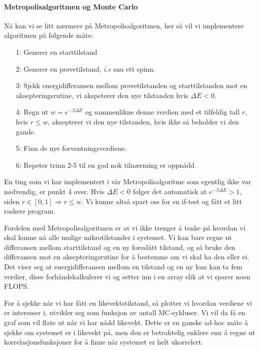 \documentclass[norsk, 10pt]{article}
\begin{document}
\paragraph{Metropolisalgoritmen og Monte Carlo}
Nå kan vi se litt nærmere på Metropolisalgoritmen, her så vil vi implementere algoritmen på følgende måte:
\begin{itemize}
\item[1:] Generer en starttilstand
\item[2:] Generer en prøvetilstand, \emph{i.e} snu ett spinn.
\item[3:] Sjekk energidifferansen mellom prøvetilstanden og starttilstanden mot en aksepteringsrutine, vi akspeterer den nye tilstanden hvis $\Delta E < 0$.
\item[4:] Regn ut $w=e^{-\beta\Delta E}$ og sammenlikne denne verdien med et tilfeldig tall $r$, hvis $r\leq w$, aksepterer vi den nye tilstanden, hvis ikke så beholder vi den gamle.
\item[5:] Finn de nye forventningsverdiene.
\item[6:] Repeter trinn 2-5 til en god nok tilnærming er oppnådd.
\end{itemize}
En ting som vi har implementert i vår Metropolisalgoritme som egentlig ikke var nødvendig, er punkt 4 over. Hvis $\Delta E < 0$ følger det automatisk at $e^{-\beta\Delta E} > 1$, siden $r \in [0,1] \Rightarrow r \leq w$. Vi kunne altså spart oss for en if-test og fått et litt raskere program.

Fordelen med Metropolisalgoritmen er at vi ikke trenger å tenke på hvordan vi skal kunne nå alle mulige mikrotilstander i systemet. Vi kan bare regne ut differansen mellom starttilstand og en ny foreslått tilstand, og så bruke den differansen mot en aksepteringsrutine for å bestemme om vi skal ha den eller ei. Det viser seg at energidifferansen mellom en tilstand og en ny kun kan ta fem verdier, disse forhåndskalkulerer vi og setter inn i en array slik at vi sparer noen FLOPS.

For å sjekke når vi har fått en likevektstilstand, så plotter vi hvordan verdiene vi er interesser i, utvikler seg som funksjon av antall MC-sykluser. Vi vil da få en graf som vil flate ut når vi har nådd likevekt. Dette er en ganske ad-hoc måte å sjekke om systemet er i likevekt på, men den er betraktelig enklere enn å regne ut korrelasjonsfunksjoner for å finne når systemet er helt ukorrelert.
\end{document}
